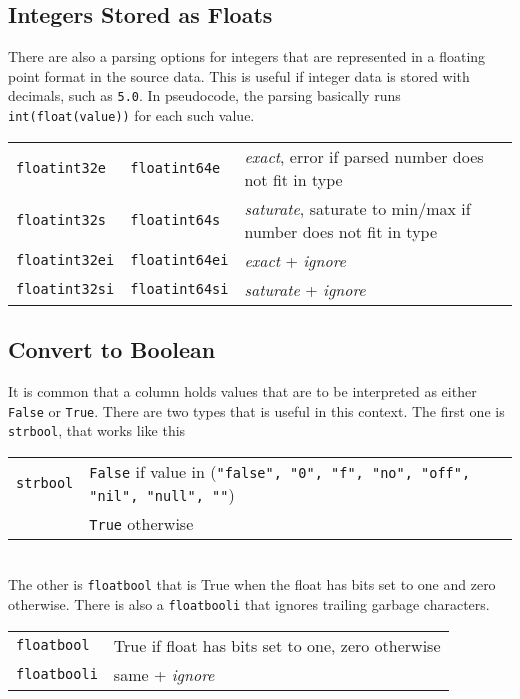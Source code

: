 \subsection{Integers Stored as Floats}

There are also a parsing options for integers that are represented in
a floating point format in the source data.  This is useful if integer
data is stored with decimals, such as \texttt{5.0}.  In pseudocode,
the parsing basically runs \texttt{int(float(value))} for each such
value.\\

\begin{tabular}{lll}
  \texttt{floatint32e} & \texttt{floatint64e}  & \emph{exact}, error if parsed number does not fit in type\\
  \texttt{floatint32s} & \texttt{floatint64s}  & \emph{saturate}, saturate to min/max if number does not fit in type\\
  \texttt{floatint32ei}& \texttt{floatint64ei} & \emph{exact} + \emph{ignore}\\
  \texttt{floatint32si}& \texttt{floatint64si} & \emph{saturate} + \emph{ignore}\\
\end{tabular}



\subsection{Convert to Boolean}
It is common that a column holds values that are to be interpreted as
either \texttt{False} or \texttt{True}.  There are two types that is
useful in this context.  The first one is \texttt{strbool}, that works like this\\

\begin{tabular}{ll}
  \texttt{strbool} & \texttt{False} if value in (\texttt{"false", "0", "f", "no", "off", "nil", "null", ""})\\
                   & \texttt{True} otherwise
\end{tabular}
\\
The other is \texttt{floatbool} that is True when the float has bits
set to one and zero otherwise.  There is also a \texttt{floatbooli}
that ignores trailing garbage characters.\\

\begin{tabular}{ll}
  \texttt{floatbool}  & True if float has bits set to one, zero otherwise\\
  \texttt{floatbooli} & same + \emph{ignore}\\
\end{tabular}



